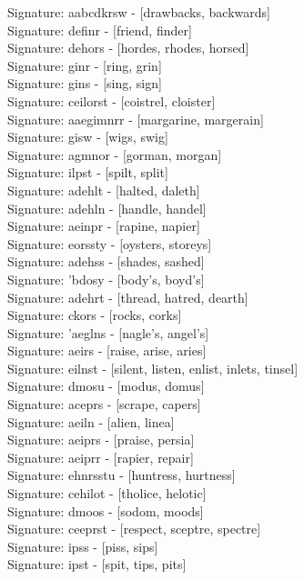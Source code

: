 Signature: {aabcdkrsw} - [drawbacks, backwards] \\
Signature: {definr} - [friend, finder] \\
Signature: {dehors} - [hordes, rhodes, horsed] \\
Signature: {ginr} - [ring, grin] \\
Signature: {gins} - [sing, sign] \\
Signature: {ceilorst} - [coistrel, cloister] \\
Signature: {aaegimnrr} - [margarine, margerain] \\
Signature: {gisw} - [wigs, swig] \\
Signature: {agmnor} - [gorman, morgan] \\
Signature: {ilpst} - [spilt, split] \\
Signature: {adehlt} - [halted, daleth] \\
Signature: {adehln} - [handle, handel] \\
Signature: {aeinpr} - [rapine, napier] \\
Signature: {eorssty} - [oysters, storeys] \\
Signature: {adehss} - [shades, sashed] \\
Signature: {'bdosy} - [body's, boyd's] \\
Signature: {adehrt} - [thread, hatred, dearth] \\
Signature: {ckors} - [rocks, corks] \\
Signature: {'aeglns} - [nagle's, angel's] \\
Signature: {aeirs} - [raise, arise, aries] \\
Signature: {eilnst} - [silent, listen, enlist, inlets, tinsel] \\
Signature: {dmosu} - [modus, domus] \\
Signature: {aceprs} - [scrape, capers] \\
Signature: {aeiln} - [alien, linea] \\
Signature: {aeiprs} - [praise, persia] \\
Signature: {aeiprr} - [rapier, repair] \\
Signature: {ehnrsstu} - [huntress, hurtness] \\
Signature: {cehilot} - [tholice, helotic] \\
Signature: {dmoos} - [sodom, moods] \\
Signature: {ceeprst} - [respect, sceptre, spectre] \\
Signature: {ipss} - [piss, sips] \\
Signature: {ipst} - [spit, tips, pits] \\
